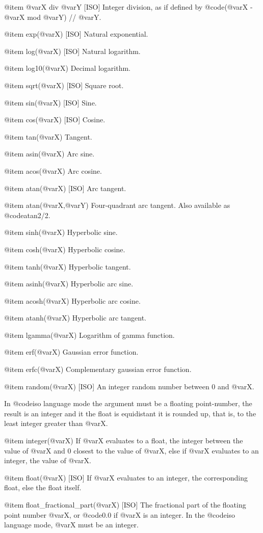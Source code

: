{{{{@item @var{X} div @var{Y} [ISO]
Integer division, as if defined by @code{(@var{X} - @var{X} mod @var{Y})
// @var{Y}}.

@item exp(@var{X}) [ISO]
Natural exponential.

@item log(@var{X}) [ISO]
Natural logarithm.

@item log10(@var{X})
Decimal logarithm.

@item sqrt(@var{X}) [ISO]
Square root.

@item sin(@var{X}) [ISO]
Sine.

@item cos(@var{X}) [ISO]
Cosine.

@item tan(@var{X})
Tangent.

@item asin(@var{X})
Arc sine.

@item acos(@var{X})
Arc cosine.

@item atan(@var{X}) [ISO]
Arc tangent.

@item atan(@var{X},@var{Y})
Four-quadrant arc tangent. Also available as @code{atan2/2}.

@item sinh(@var{X})
Hyperbolic sine.

@item cosh(@var{X})
Hyperbolic cosine.

@item tanh(@var{X})
Hyperbolic tangent.

@item asinh(@var{X})
Hyperbolic arc sine.

@item acosh(@var{X})
Hyperbolic arc cosine.

@item atanh(@var{X})
Hyperbolic arc tangent.

@item lgamma(@var{X})
Logarithm of gamma function.

@item erf(@var{X})
Gaussian error function.

@item erfc(@var{X})
Complementary gaussian error function.

@item random(@var{X}) [ISO]
An integer random number between 0 and @var{X}.

In @code{iso} language mode the argument must be a floating
point-number, the result is an integer and it the float is equidistant
it is rounded up, that is, to the least integer greater than @var{X}.

@item integer(@var{X})
If @var{X} evaluates to a float, the integer between the value of @var{X}
and 0 closest to the value of @var{X}, else if @var{X} evaluates to an
integer, the value of @var{X}.

@item float(@var{X}) [ISO]
If @var{X} evaluates to an integer, the corresponding float, else the float
itself.

@item float_fractional_part(@var{X}) [ISO]
The fractional part of the floating point number @var{X}, or @code{0.0}
if @var{X} is an integer. In the @code{iso} language mode,
@var{X} must be an integer.

}}}}

